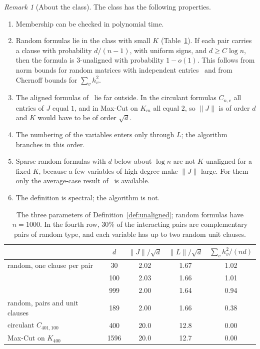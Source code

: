 \documentclass[11pt,a4paper]{article}
\theoremstyle{definition}
\theoremstyle{remark}
\newtheorem{remark}[theorem]{Remark}
\begin{document}
\begin{remark}[About the class]\label{rem:class}
The class has the following properties.
\begin{enumerate}
 \item Membership can be checked in polynomial time.
 \item Random formulas lie in the class with small $K$
 (Table~\ref{tab:params}). If each pair carries a clause with probability
 $d/(n-1)$, with uniform signs, and $d\ge C\log n$, then the formula is
 $3$-unaligned with probability $1-o(1)$. This follows from norm bounds for
 random matrices with independent entries~\cite{BvH16} and from Chernoff
 bounds for $\sum_vh_v^2$.
 \item The aligned formulas of~\cite{N3,N4} lie far outside. In the circulant
 formulas $C_{n,c}$ all entries of $J$ equal $1$, and in Max-Cut on $K_m$ all
 equal $2$, so $\|J\|$ is of order $d$ and $K$ would have to be of order
 $\sqrt d$.
 \item The numbering of the variables enters only through $L$; the algorithm
 branches in this order.
 \item Sparse random formulas with $d$ below about $\log n$ are not
 $K$-unaligned for a fixed $K$, because a few variables of high degree make
 $\|J\|$ large. For them only the average-case result of~\cite{N8} is
 available.
 \item The definition is spectral; the algorithm is not.
\end{enumerate}
\end{remark}

\begin{table}[ht]
\centering
\begin{tabular}{lcccc}
\toprule
 & $d$ & $\|J\|/\sqrt d$ & $\|L\|/\sqrt d$ & $\sum_vh_v^2/(nd)$\\
\midrule
random, one clause per pair & 30 & 2.02 & 1.67 & 1.02\\
 & 100 & 2.03 & 1.66 & 1.01\\
 & 999 & 2.00 & 1.64 & 0.94\\
random, pairs and unit clauses & 189 & 2.00 & 1.66 & 0.38\\
circulant $C_{401,100}$ & 400 & 20.0 & 12.8 & 0.00\\
Max-Cut on $K_{400}$ & 1596 & 20.0 & 12.7 & 0.00\\
\bottomrule
\end{tabular}
\caption{The three parameters of Definition~\ref{def:unaligned}; random
formulas have $n=1000$. In the fourth row, $30\%$ of the interacting pairs are
complementary pairs of random type, and each variable has up to two random
unit clauses.}\label{tab:params}
\end{table}
\end{document}
